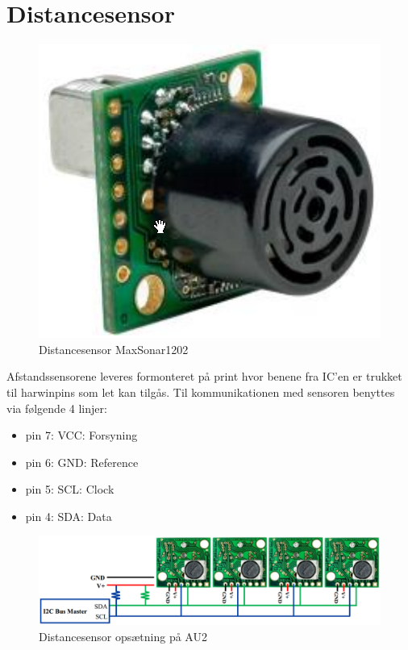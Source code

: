 \section{Distancesensor} \label{sub:hw_design_distancesensor}

\begin{figure}[ht]
	\centering
	\includegraphics[scale=0.4]{../fig/billeder/distancesensor.png}
	\caption{Distancesensor MaxSonar1202}
	\label{fig:ds_pic}
\end{figure}

Afstandssensorene leveres formonteret på print hvor benene fra IC'en er trukket til harwinpins som let kan tilgås. Til kommunikationen med sensoren benyttes \IIC via følgende 4 linjer: 

\begin{itemize}
	\item pin 7: VCC: Forsyning
	\item pin 6: GND: Reference
	\item pin 5: SCL: Clock
	\item pin 4: SDA: Data
\end{itemize}

\begin{figure}[ht]
	\centering
	\includegraphics[scale=0.45]{../fig/billeder/distancesensor_multi.png}
	\caption{Distancesensor opsætning på AU2}
	\label{fig:ds_multi}
\end{figure}

